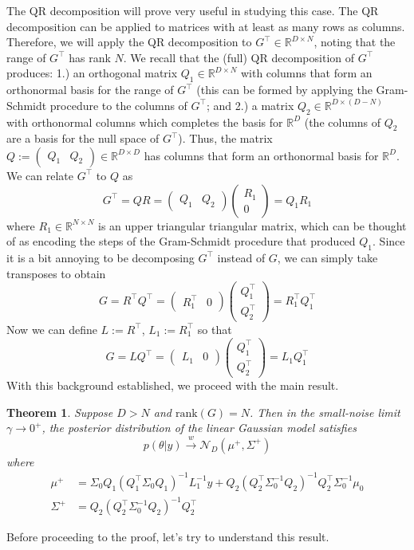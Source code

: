 \documentclass[12pt]{article}
\newcommand{\R}{\mathbb{R}}
\newtheorem{thm}{Theorem}
\begin{document}
The QR decomposition will prove very useful in studying this case. The QR decomposition 
can be applied to matrices with at least as many rows as columns. Therefore, we will apply the QR decomposition to $G^{\top} \in \R^{D \times N}$, noting that 
the range of $G^{\top}$ has rank $N$. 
We recall that the (full) QR decomposition of $G^{\top}$ produces: 1.) an orthogonal matrix $Q_1 \in \R^{D \times N}$ with columns 
that form an orthonormal basis for the range of $G^{\top}$ (this can be formed by applying the Gram-Schmidt procedure to the columns of $G^{\top}$; and 2.) a matrix 
$Q_2 \in \R^{D \times (D - N)}$ with orthonormal columns which completes the basis for $\R^D$ (the columns of $Q_2$ are a basis for the null space of $G^{\top}$). 
Thus, the matrix $Q := \begin{pmatrix} Q_1 & Q_2 \end{pmatrix} \in \R^{D \times D}$ has columns that form an orthonormal basis for $\R^D$. We can relate $G^{\top}$ 
to $Q$ as 
\[
G^{\top} = QR = \begin{pmatrix} Q_1 & Q_2 \end{pmatrix} \begin{pmatrix} R_1 \\ 0 \end{pmatrix} = Q_1 R_1
\]
where $R_1 \in \R^{N \times N}$ is an upper triangular triangular matrix, which can be thought of as encoding the steps of the Gram-Schmidt procedure that produced 
$Q_1$. Since it is a bit annoying to be decomposing $G^{\top}$ instead of $G$, we can simply take transposes to obtain 
\[
G = R^{\top} Q^{\top} = \begin{pmatrix} R_1^{\top} & 0 \end{pmatrix}  \begin{pmatrix} Q_1^{\top} \\ Q_2^{\top} \end{pmatrix} = R^{\top}_1 Q^{\top}_1 
\]
Now we can define $L := R^{\top}$, $L_1 := R_1^{\top}$ so that 
\[
G = L Q^{\top} = \begin{pmatrix} L_1 & 0 \end{pmatrix}  \begin{pmatrix} Q_1^{\top} \\ Q_2^{\top} \end{pmatrix} = L_1 Q^{\top}_1 
\]
With this background established, we proceed with the main result. 

\begin{thm}
Suppose $D > N$ and $\text{rank}(G) = N$. Then in the small-noise limit $\gamma \to 0^+$, the posterior distribution of the linear Gaussian model satisfies
\[p(\theta|y) \overset{w}{\to} \mathcal{N}_D(\mu^+, \Sigma^+)\]
where 
\begin{align*}
\mu^+ &= \Sigma_0 Q_1\left(Q_1^\top \Sigma_0 Q_1 \right)^{-1} L_1^{-1} y + Q_2\left(Q_2^\top \Sigma_0^{-1} Q_2 \right)^{-1} Q_2^\top \Sigma_0^{-1} \mu_0 \\
\Sigma^+ &= Q_2 \left(Q_2^\top \Sigma_0^{-1} Q_2 \right)^{-1} Q_2^\top
\end{align*}
\end{thm}
Before proceeding to the proof, let's try to understand this result. 
\end{document}
